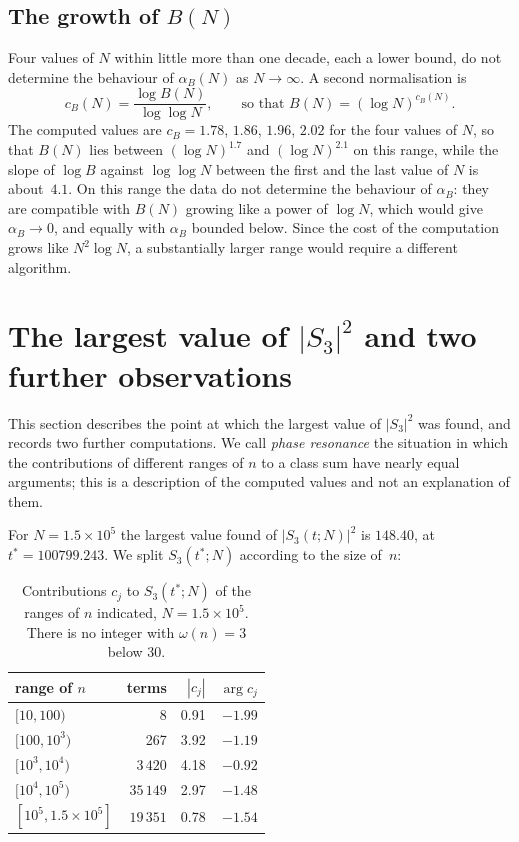 \documentclass[11pt]{amsart}
\theoremstyle{definition}
\theoremstyle{remark}
\begin{document}
\subsection{The growth of \texorpdfstring{$B(N)$}{B(N)}}

Four values of $N$ within little more than one decade, each a lower
bound, do not determine the behaviour of $\alpha_B(N)$ as $N\to\infty$.
A second normalisation is
\begin{equation}\label{eq:alphaB_model}
  c_B(N) = \frac{\log B(N)}{\log\log N},
  \qquad\text{so that } B(N)=(\log N)^{c_B(N)} .
\end{equation}
The computed values are $c_B=1.78$, $1.86$, $1.96$, $2.02$ for the four
values of $N$, so that $B(N)$ lies between $(\log N)^{1.7}$ and
$(\log N)^{2.1}$ on this range, while the slope of $\log B$ against
$\log\log N$ between the first and the last value of $N$ is about~$4.1$.
On this range the data do not determine the behaviour of $\alpha_B$: they
are compatible with $B(N)$ growing like a power of $\log N$, which would
give $\alpha_B\to0$, and equally with $\alpha_B$ bounded below.  Since the
cost of the computation grows like $N^2\log N$, a substantially larger
range would require a different algorithm.

\section{The largest value of \texorpdfstring{$|S_3|^2$}{|S\_3|\textasciicircum 2} and two further observations}
\label{sec:resonance}

This section describes the point at which the largest value of $|S_3|^2$
was found, and records two further computations.  We call \emph{phase
resonance} the situation in which the contributions of different ranges
of $n$ to a class sum have nearly equal arguments; this is a description
of the computed values and not an explanation of them.

For $N = 1.5 \times 10^5$ the largest value found of $|S_3(t;N)|^2$ is
$148.40$, at $t^* = 100799.243$.  We split $S_3(t^*;N)$ according to the
size of~$n$:

\begin{table}[H]
\centering
\caption{Contributions $c_j$ to $S_3(t^*;N)$ of the ranges of $n$
indicated, $N = 1.5 \times 10^5$.  There is no integer with $\omega(n)=3$
below $30$.}
\label{tab:resonance}
\begin{tabular}{lrrr}
\toprule
range of $n$ & terms & $|c_j|$ & $\arg c_j$ \\
\midrule
$[10, 100)$ & 8 & 0.91 & $-1.99$ \\
$[100, 10^3)$ & 267 & 3.92 & $-1.19$ \\
$[10^3, 10^4)$ & $3\,420$ & 4.18 & $-0.92$ \\
$[10^4, 10^5)$ & $35\,149$ & 2.97 & $-1.48$ \\
$[10^5, 1.5 {\times} 10^5]$ & $19\,351$ & 0.78 & $-1.54$ \\
\bottomrule
\end{tabular}
\end{table}
\end{document}
